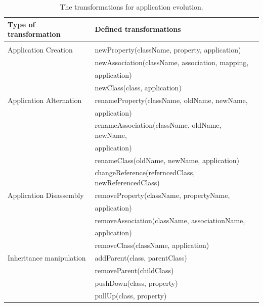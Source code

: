 \documentclass[runningheads]{comsis}
\begin{document}
\begin{table}
\caption{The transformations for application evolution.}
	\label{tab:app-evolution}
\centering
	\begin{tabular}{ll}
	\hline
	Type of transformation & Defined transformations \\
	\hline
	\\[-2ex] 
	Application Creation
	& newProperty(className, property, application) \\
	& newAssociation(className, association, mapping, \\ &  \hspace{0.5in}application) \\
	&  newClass(class, application) \\
	Application Alternation
		& renameProperty(className, oldName, newName, \\ &  \hspace{0.5in} application) \\
		& renameAssociation(className, oldName, newName, \\ &  \hspace{0.5in}application) \\
		& renameClass(oldName, newName, application)\\
		& changeReference(referncedClass, newReferencedClass) \\
		Application Disassembly 
		& removeProperty(className, propertyName,\\ &  \hspace{0.5in} application) \\
		& removeAssociation(className, associationName, \\ &  \hspace{0.5in}application) \\
		& removeClass(className, application)\\
	Inheritance manipulation   & addParent(class, parentClass) \\
		& removeParent(childClass) \\
		& pushDown(class, property)\\
		& pullUp(class, property)\\
	\hline
	\end{tabular}
\end{table}
\end{document}
